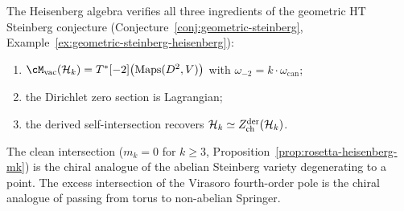 \begin{remark}
\label{rem:rosetta-geometric-steinberg}
The Heisenberg algebra verifies all three ingredients of the
geometric HT Steinberg conjecture
(Conjecture~\ref{conj:geometric-steinberg},
Example~\ref{ex:geometric-steinberg-heisenberg}):
\begin{enumerate}[label=\textup{(\alph*)}]
\item $\cM_{\mathrm{vac}}(\cH_k) =
 T^*[-2]\bigl(\operatorname{Maps}(D^2, V)\bigr)$ with
 $\omega_{-2} = k \cdot \omega_{\mathrm{can}}$;
\item the Dirichlet zero section is Lagrangian;
\item the derived self-intersection recovers
 $\mathcal{H}_k \simeq Z^{\mathrm{der}}_{\mathrm{ch}}(\mathcal{H}_k)$.
\end{enumerate}
The clean intersection ($m_k = 0$ for $k \ge 3$,
Proposition~\ref{prop:rosetta-heisenberg-mk}) is the chiral
analogue of the abelian Steinberg variety degenerating to a point.
The excess intersection of the Virasoro fourth-order pole is the
chiral analogue of passing from torus to non-abelian Springer.
\end{remark}

